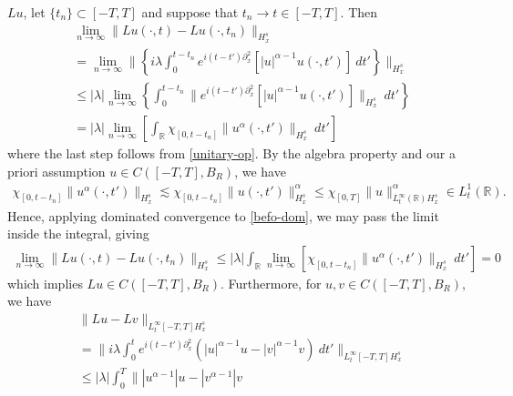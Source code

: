 \documentclass[12pt,reqno]{amsart}
\newcommand{\rr}{\mathbb{R}}
\newcommand{\p}{\partial}
\theoremstyle{plain}  %
\begin{document}
\begin{appendices}
$Lu$, let $\{t_n\} \subset [-T, T]$ and suppose that $t_n \to t \in [-T, 
T]$. Then
%
%
\begin{equation}
	\label{befo-dom}
	\begin{split}
		& \lim_{n \to \infty} \|Lu(\cdot, t) - Lu(\cdot, t_n)\|_{H^s_x} 
		\\
		& = \lim_{n \to \infty} \| \left \{ i \lambda \int_0^{t - t_n} e^{i(t  
		- t') \p_x^2} \left [|u|^{\alpha -1}u( \cdot, t') \right ]
		\ dt'\right \} \|_{H^s_x}
		\\
		& \le |\lambda|
		\lim_{n \to \infty}  \left \{  \int_0^{t - t_n} \| e^{i(t  
		- t') \p_x^2} \left [ |u|^{\alpha -1}u( \cdot, t') \right ]  
		\|_{H^s_x} \ dt' \right \}
		\\
		& = |\lambda|
		\lim_{n \to \infty}  \left[  \int_\rr \chi_{[0, t-t_n]}
		\| u^{\alpha}(\cdot, t') \|_{H^s_x} \ dt' \right ]
	\end{split}
\end{equation}
%
%
where the last step follows from \eqref{unitary-op}. 
By the algebra property and our a priori
assumption $u \in C([-T, T], B_R )$, we have 
%
%
\begin{equation*}
	\begin{split}
		\chi_{[0,t-t_n]}	\|u^\alpha(\cdot, t')\|_{H^s_x}
		\lesssim \chi_{[0,t-t_n]} 	\|u(\cdot, t')\|_{H^s_x}^\alpha 
		\le \chi_{[0,T]}\|u\|^\alpha_{L^\infty_t(\rr) H^s_x} \in 
		L^1_t(\rr).
		\end{split}
\end{equation*}
%
%
%
%
Hence, applying dominated 
convergence to \eqref{befo-dom}, we may pass the limit inside the integral,  
giving
%
\begin{equation*}
	\begin{split}
		\lim_{n \to \infty} \|Lu(\cdot, t)  - Lu(\cdot, t_n)\|_{H^s_x} 
		\le |\lambda|
		\int_\rr \lim_{n \to \infty} \left [ \chi_{[0, t-t_n]}
		\| u^{\alpha}(\cdot, t') \|_{H^s_x} \ dt' \right ]
		= 0
	\end{split}
\end{equation*}
%
%
which implies $Lu \in C([-T, T], B_R)$. Furthermore, for 
$u, v \in C([-T, T], B_R)$, we have
%
%
\begin{equation*}
	\begin{split}
		& \|Lu-Lv\|_{L^\infty_t[-T, T] H^s_x}
		\\
		& = \|i \lambda \int_0^t e^{i(t 
		-t')\p_x^2} (|u|^{\alpha - 1}u -|v|^{\alpha -1} v ) \ dt'
		\|_{L^\infty_t[-T, T] H^s_x}
		\\
		& \le |\lambda| \int_0^T \||u^{\alpha-1 }| u - | v^{\alpha - 1}| v

\end{split}
\end{equation*}
\end{appendices}
\end{document}
